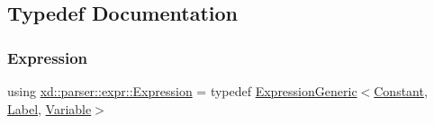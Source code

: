 \subsection{Typedef Documentation}
\mbox{\label{namespacexd_1_1parser_1_1expr_a5ac81194bba038e6a1c652c9d95288d6}} 
\subsubsection{\texorpdfstring{Expression}{Expression}}
{\footnotesize\ttfamily using \mbox{\hyperlink{namespacexd_1_1parser_1_1expr_a5ac81194bba038e6a1c652c9d95288d6}{xd\+::parser\+::expr\+::\+Expression}} = typedef \mbox{\hyperlink{structxd_1_1parser_1_1expr_1_1_expression_generic}{Expression\+Generic}}$<$\mbox{\hyperlink{structxd_1_1parser_1_1expr_1_1_constant}{Constant}}, \mbox{\hyperlink{structxd_1_1parser_1_1expr_1_1_label}{Label}}, \mbox{\hyperlink{structxd_1_1parser_1_1expr_1_1_variable}{Variable}}$>$}


